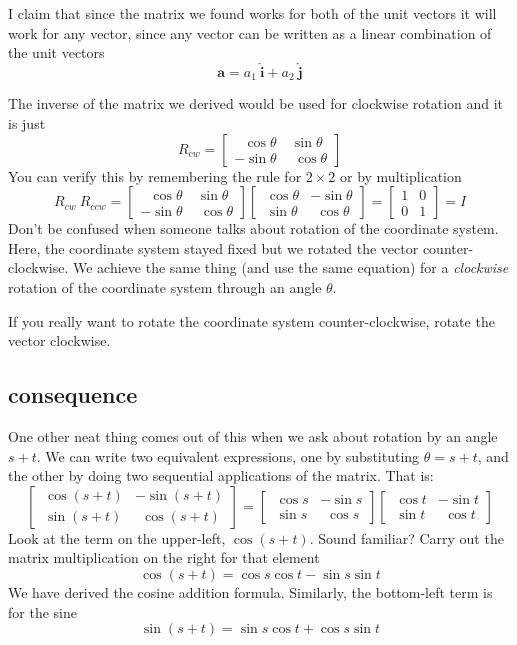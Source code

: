 \documentclass[11pt, oneside]{report}   	%
\begin{document}
I claim that since the matrix we found works for both of the unit vectors it will work for any vector, since any vector can be written as a linear combination of the unit vectors
\[ \mathbf{a} = a_1 \ \hat{\mathbf{i}} + a_2 \ \hat{\mathbf{j}} \]

The inverse of the matrix we derived would be used for clockwise rotation and it is just
\[
R_{cw} =
\begin{bmatrix}   \ \ \ \cos \theta & \ \sin \theta  \\  -\sin \theta & \ \ \cos \theta  \end{bmatrix}
\]
You can verify this by remembering the rule for $2 \times 2$ or by multiplication
\[
R_{cw} \  R_{ccw} =
\begin{bmatrix}   \ \ \ \cos \theta & \ \sin \theta  \\  -\sin \theta & \ \ \cos \theta  \end{bmatrix}
\begin{bmatrix}   \ \cos \theta & -\sin \theta  \\  \ \sin \theta & \ \ \cos \theta  \end{bmatrix}
= 
\begin{bmatrix}   1 & 0  \\  0 & 1 \end{bmatrix}
= I
\]
Don't be confused when someone talks about rotation of the coordinate system.  Here, the coordinate system stayed fixed but we rotated the vector counter-clockwise.  We achieve the same thing (and use the same equation) for a \emph{clockwise} rotation of the coordinate system through an angle $\theta$.

If you really want to rotate the coordinate system counter-clockwise, rotate the vector clockwise.

\subsection*{consequence}

One other neat thing comes out of this when we ask about rotation by an angle $s + t$.  We can write two equivalent expressions, one by substituting $\theta=s+t$, and the other by doing two sequential applications of the matrix.  That is:
\[
\begin{bmatrix}   \ \cos (s+t) & -\sin (s+t)  \\  \ \sin (s+t) & \ \ \cos (s+t)  \end{bmatrix} =
\begin{bmatrix}   \ \cos s & -\sin s  \\  \ \sin s & \ \ \cos s  \end{bmatrix}
\begin{bmatrix}   \ \cos t & -\sin t  \\  \ \sin t & \ \ \cos t  \end{bmatrix}
\]
Look at the term on the upper-left, $\cos(s+t)$.  Sound familiar?  Carry out the matrix multiplication on the right for that element
\[ \cos(s+t) = \cos s \cos t - \sin s \sin t \]
We have derived the cosine addition formula.  Similarly, the bottom-left term is for the sine
\[ \sin(s+t) = \sin s \cos t + \cos s \sin t \]
\end{document}
